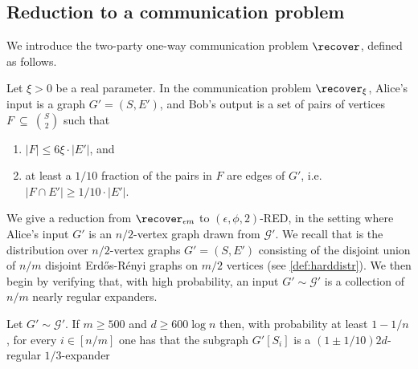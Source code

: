 \subsection{Reduction to a communication problem}
\label{subsec:reductioncomm}
We introduce the two-party one-way communication problem $\recover$, defined as follows.
\begin{definition}
	\label{def:recover}
	Let $\xi >0$  be a real parameter. In the communication problem $\recover_{\xi}$,
	Alice's input is a graph $G'=(S,E')$, and Bob's output is a set of pairs of vertices $F~\subseteq~\binom{S}{2}$ such that
	\begin{enumerate}
		\item \label{recover:fsmall} $|F| \le 6 \xi\cdot |E'| $, and
		\item \label{recover:flearns} at least a $1/10$ fraction of the pairs in $F$ are edges of $G'$, i.e. $|F \cap E'| \ge 1/10\cdot |E'|$.
	\end{enumerate}
\end{definition}
\noindent
We give a reduction from $\recover_{\epsilon m}$ to $(\epsilon, \phi,2)$-RED, in the setting where Alice's input $G'$ is an $n/2$-vertex graph drawn from $\mathcal{G}'$. We recall that  is the distribution over $n/2$-vertex graphs $G'=(S,E')$ consisting of the disjoint union of $n/m$ disjoint Erd\H{o}s-R\'{e}nyi graphs on $m/2$ vertices (see \cref{def:harddistr}). We then begin by verifying that, with high probability, an input $G' \sim \mathcal{G}'$ is a collection of $n/m$ nearly regular expanders.

\begin{lemma} \label{lem:leftexpander}
	Let $G' \sim \mathcal{G}'$. If $m\ge 500$ and $d \ge 600 \log n$ then,  with probability at least $1-1/n$, for every $i \in [n/m]$ one has that the subgraph $G'[S_i]$ is a $(1 \pm 1/10)2d$-regular $1/3$-expander
\end{lemma}

